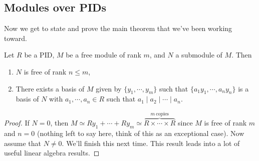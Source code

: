 \subsection{Modules over PIDs}
Now we get to state and prove the main theorem that we've been working toward.
\begin{theorem}\label{free}
   Let $R$ be a PID, $M$ be a free module of rank $m$, and $N$ a submodule of $M$. Then 
   \begin{enumerate}[label=\arabic*)]
       \item $N$ is free of rank $n\leq m$,
       \item There exists a basis of $M $ given by  $\{y_1,\cdots ,y_m\} $ such that $\{a_1y_1,\cdots ,a_n y_n \} $ is a basis of $N$ with $a_1,\cdots ,a_n \in R$ such that $a_1 \mid a_2 \mid \cdots  \mid a_n $.
   \end{enumerate}
\end{theorem}
\begin{proof}
    If $N=0$, then $M\simeq Ry_1+\cdots +Ry_m\simeq \overset{m \ \text{copies} }{\overbrace{R\times \cdots \times R}} $ since $M$ is free of rank $m$ and $n=0$ (nothing left to say here, think of this as an exceptional case). Now assume that $N\neq 0$. We'll finish this next time. This result leads into a lot of useful linear algebra results.
\end{proof}
